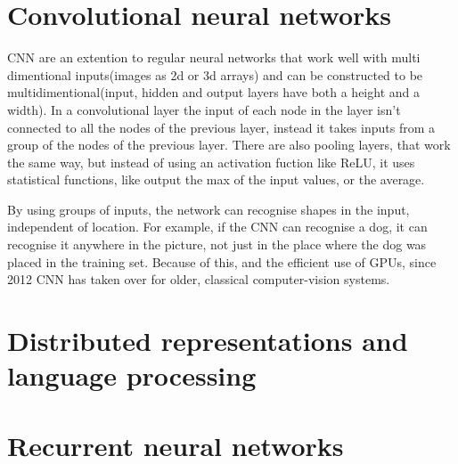 \documentclass[11pt, letterpaper]{report}
\numberwithin{equation}{section}
\begin{document}
\section{ Convolutional neural networks }
CNN are an extention to regular neural networks that work well with multi
dimentional inputs(images as 2d or 3d arrays) and can be constructed to be
multidimentional(input, hidden and output layers have both a height and a
width). In a convolutional layer the input of each node in the layer isn't
connected to all the nodes of the previous layer, instead it takes inputs from
a group of the nodes of the previous layer. There are also pooling layers, that
work the same way, but instead of using an activation fuction like ReLU, it uses
statistical functions, like output the max of the input values, or the average.

By using groups of inputs, the network can recognise shapes in the input,
independent of location. For example, if the CNN can recognise a dog, it can
recognise it anywhere in the picture, not just in the place where the dog was
placed in the training set. Because of this, and the efficient use of GPUs,
since 2012 CNN has taken over for older, classical computer-vision systems.

\section{Distributed representations and language processing}


\section{Recurrent neural networks}
\end{document}

